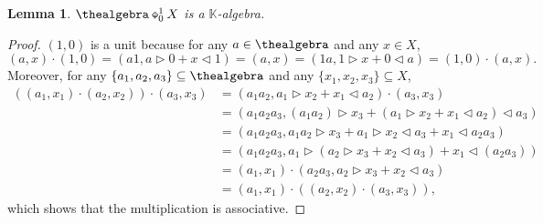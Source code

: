 \documentclass[10pt,a4paper]{amsart}
\numberwithin{equation}{section}
\newtheorem{Lemma}[Theorem]{Lemma}
\newcommand{\diamondplus}{\mathbin{\ooalign{\hfil$\diamond$\hfil\cr\hfil$\scriptscriptstyle+$\hfil\cr}}}
\newcommand{\HSalgebraconstructdeform}[4]{#2\diamondplus^{#1}_{#4}#3}
\newcommand{\Smonoidalproduct}{\otimes}
\newcommand{\Sleftmoduleaction}{\triangleright}
\newcommand{\Srightmoduleaction}{\triangleleft}
\newcommand{\thefield}{\mathbb{K}}
\newcommand{\themodule}{X}
\begin{document}
{{
  \newcommand{\thedeform}{c}
  \newcommand{\anyelement}{a}
  \newcommand{\firstelement}{a_1}
      \newcommand{\secondelement}{a_2}
      \newcommand{\thirdelement}{a_3}
  \newcommand{\thedeformxx}[2]{c(#1 \Smonoidalproduct #2)}
  \begin{Lemma}
    \label{lemma:the-bfg-algebra}
     $\HSalgebraconstructdeform{1}{\thealgebra}{\themodule}{0}$ is a $\thefield$-algebra.
  \end{Lemma}
  \begin{proof}
      \newcommand{\somea}{a}
      \newcommand{\somex}{x}
      \newcommand{\firsta}{a_1}
      \newcommand{\seconda}{a_2}
      \newcommand{\thirda}{a_3}
      \newcommand{\firstx}{x_1}
      \newcommand{\secondx}{x_2}
      \newcommand{\thirdx}{x_3}
$(1,0)$ is a unit because for any $\somea\in\thealgebra$ and any $\somex\in\themodule$,
      \[
        (\somea,\somex)\cdot(1,0)=(\somea 1, \somea\Sleftmoduleaction 0+\somex\Srightmoduleaction 1)=(\somea , \somex)= (1 \somea , 1\Sleftmoduleaction \somex+0\Srightmoduleaction \somea)=  (1,0)\cdot(\somea,\somex).
      \]
 Moreover, for any $\{\firsta,\seconda,\thirda\}\subseteq \thealgebra$ and any $\{\firstx,\secondx,\thirdx\}\subseteq \themodule$,
      \begin{align*}
        ((\firsta,\firstx)\cdot (\seconda,\secondx))\cdot(\thirda,\thirdx)
      &{}=(\firsta\seconda,\firsta\Sleftmoduleaction\secondx+\firstx\Srightmoduleaction\seconda)\cdot (\thirda,\thirdx)\\
        &{}=(\firsta\seconda\thirda,(\firsta\seconda)\Sleftmoduleaction\thirdx+(\firsta\Sleftmoduleaction\secondx+\firstx\Srightmoduleaction\seconda)\Srightmoduleaction\thirda)\\        &{}=(\firsta\seconda\thirda,\firsta\seconda\Sleftmoduleaction\thirdx+\firsta\Sleftmoduleaction\secondx\Srightmoduleaction\thirda+\firstx\Srightmoduleaction\seconda\thirda) \\        &{}=(\firsta\seconda\thirda,\firsta\Sleftmoduleaction(\seconda\Sleftmoduleaction\thirdx+\secondx\Srightmoduleaction\thirda)+\firstx\Srightmoduleaction(\seconda\thirda))\\
        &{}=  (\firsta,\firstx)\cdot(\seconda\thirda,\seconda\Sleftmoduleaction\thirdx+\secondx\Srightmoduleaction\thirda)\\
        &{}= (\firsta,\firstx)\cdot ((\seconda,\secondx)\cdot(\thirda,\thirdx)),
\end{align*}
which shows that the multiplication is associative.
  \end{proof}
  }

}
\end{document}

